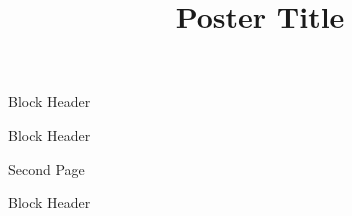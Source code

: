 \documentclass{tugPoster}
\title{Poster Title}
\begin{document}
	\maketitle

	\begin{IPTtwocol}

		\begin{IPTblock}{Block Header}
			\lipsum[1]
		\end{IPTblock}

	\IPTcolbreak

		\begin{IPTblock}{Block Header}
			\lipsum[2]
		\end{IPTblock}

	\end{IPTtwocol}

	\newpage

	\begin{IPTtwocol}

		\begin{IPTblock}{Second Page}
			\lipsum[3]
		\end{IPTblock}

	\IPTcolbreak

		\begin{IPTblock}{Block Header}
			\lipsum[4]
		\end{IPTblock}

	\end{IPTtwocol}
\end{document}
